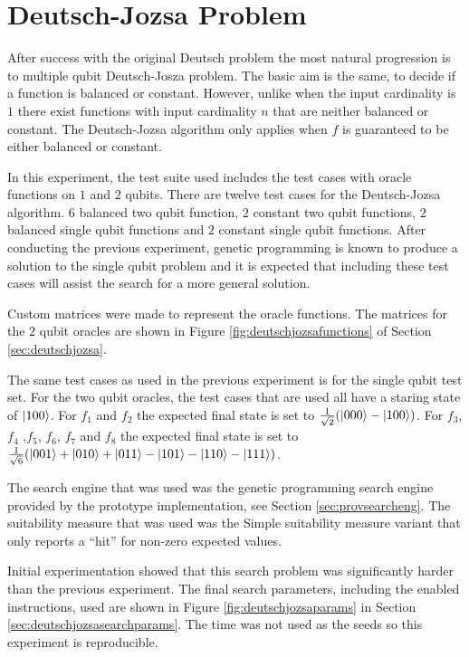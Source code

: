 \section{Deutsch-Jozsa Problem}
\label{sec:deutschjozsaexperiment}

After success with the original Deutsch problem the most natural progression is to multiple qubit Deutsch-Josza problem.
The basic aim is the same, to decide if a function is balanced or constant.
However, unlike when the input cardinality is $1$ there exist functions with input cardinality $n$ that are neither balanced or constant.
The Deutsch-Jozsa algorithm only applies when $f$ is guaranteed to be either balanced or constant.

In this experiment, the test suite used includes the test cases with oracle functions on $1$ and $2$ qubits.
There are twelve test cases for the Deutsch-Jozsa algorithm.
$6$ balanced two qubit function, $2$ constant two qubit functions, $2$ balanced single qubit functions and $2$ constant single qubit functions.
After conducting the previous experiment, genetic programming is known to produce a solution to the single qubit problem and it is expected that including these test cases will assist the search for a more general solution.

Custom matrices were made to represent the oracle functions.
The matrices for the $2$ qubit oracles are shown in Figure \ref{fig:deutschjozsafunctions} of Section \ref{sec:deutschjozsa}.

The same test cases as used in the previous experiment is for the single qubit test set.
For the two qubit oracles, the test cases that are used all have a staring state of $\left\vert{100}\right\rangle$.
For $f_1$ and $f_2$ the expected final state is set to $\frac{1}{\sqrt{2}}(\left\vert{000}\right\rangle-\left\vert{100}\right\rangle)$.
For $f_3$, $f_4$ ,$f_5$, $f_6$, $f_7$ and $f_8$ the expected final state is set to $\frac{1}{\sqrt{6}}(\left\vert{001}\right\rangle+\left\vert{010}\right\rangle+\left\vert{011}\right\rangle-\left\vert{101}\right\rangle-\left\vert{110}\right\rangle-\left\vert{111}\right\rangle)$.

The search engine that was used was the genetic programming search engine provided by the prototype implementation, see Section \ref{sec:provsearcheng}.
The suitability measure that was used was the Simple suitability measure variant that only reports a ``hit'' for non-zero expected values.

Initial experimentation showed that this search problem was significantly harder than the previous experiment.
The final search parameters, including the enabled instructions, used are shown in Figure \ref{fig:deutschjozsaparams} in Section \ref{sec:deutschjozsasearchparams}.
The time was not used as the seeds so this experiment is reproducible.

